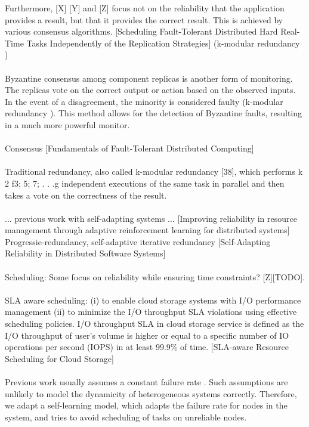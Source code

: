 \documentclass{cslthse-msc}
\begin{document}
Furthermore, [X] [Y] and [Z] focus not on the reliability that the application provides a result, but that it provides the correct result. This is achieved by various consensus algorithms. [Scheduling Fault-Tolerant Distributed Hard Real-Time Tasks Independently of the Replication Strategies] (k-modular redundancy \cite{Self-Adapting Reliability in Distributed Software Systems})
\\\\
Byzantine consensus among component replicas is another form of monitoring. The replicas vote on the correct output or action based on the observed inputs. In the event of a disagreement, the minority is considered faulty (k-modular redundancy \cite{Self-Adapting Reliability in Distributed Software Systems}). This method allows for the detection of Byzantine faults, resulting in a much more powerful monitor.  \cite{surveyFaultParallel}
\\\\
Consensus [Fundamentals of Fault-Tolerant Distributed Computing]
\\\\
Traditional redundancy, also called k-modular redundancy [38], which performs k 2 f3; 5; 7; . . .g independent executions of the same task in parallel and then takes a vote on the correctness of the result. 
\\\\
... previous work with self-adapting systems ... [Improving reliability in resource management through adaptive reinforcement learning for distributed systems]
Progressie-redundancy, self-adaptive iterative redundancy [Self-Adapting Reliability in Distributed Software Systems]
\\\\
Scheduling:
Some focus on reliability while ensuring time constraints? [Z][TODO].
\\\\
SLA aware scheduling: 
 (i) to enable cloud storage systems with I/O performance management (ii) to minimize the I/O throughput SLA violations using effective scheduling policies. I/O throughput SLA in cloud storage service is defined as the I/O throughput of user’s volume is higher or equal to a specific number of IO operations per second (IOPS) in at least 99.9\% of time. [SLA-aware Resource Scheduling for Cloud Storage]
 \\\\
 Previous work usually assumes a constant failure rate \cite{algoMaxRelEndToEndConstraint} \cite{algoMinExTime} \cite{relModelDistSimSystem} \cite{optTaskAllocationForMaxRel} \cite{perfImplPerCheckPoint}. Such assumptions are unlikely to model the dynamicity of heterogeneous systems correctly. Therefore, we adapt a self-learning model, which adapts the failure rate for nodes in the system, and tries to avoid scheduling of tasks on unreliable nodes.
\end{document}
